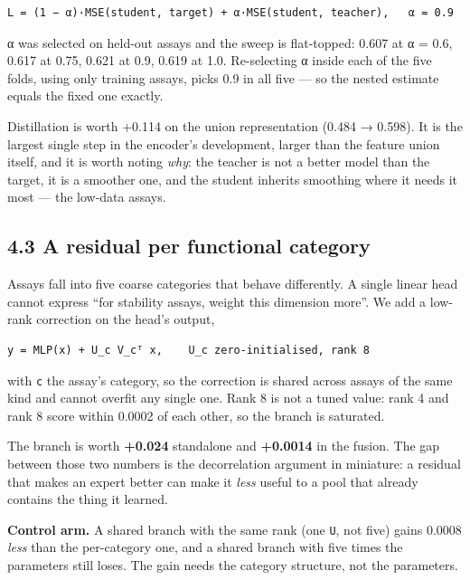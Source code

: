 \begin{verbatim}
L = (1 − α)·MSE(student, target) + α·MSE(student, teacher),   α = 0.9
\end{verbatim}

α was selected on held-out assays and the sweep is flat-topped: 0.607 at α = 0.6, 0.617 at 0.75, 0.621
at 0.9, 0.619 at 1.0. Re-selecting α inside each of the five folds, using only training assays, picks
0.9 in all five --- so the nested estimate equals the fixed one exactly.

Distillation is worth +0.114 on the union representation (0.484 → 0.598). It is the largest single step
in the encoder's development, larger than the feature union itself, and it is worth noting \emph{why}: the
teacher is not a better model than the target, it is a smoother one, and the student inherits smoothing
where it needs it most --- the low-data assays.

\hypertarget{a-residual-per-functional-category}{%
\subsection{4.3 A residual per functional category}\label{a-residual-per-functional-category}}

Assays fall into five coarse categories that behave differently. A single linear head cannot express
``for stability assays, weight this dimension more''. We add a low-rank correction on the head's output,

\begin{verbatim}
y = MLP(x) + U_c V_cᵀ x,    U_c zero-initialised, rank 8
\end{verbatim}

with \texttt{c} the assay's category, so the correction is shared across assays of the same kind and cannot
overfit any single one. Rank 8 is not a tuned value: rank 4 and rank 8 score within 0.0002 of each
other, so the branch is saturated.

The branch is worth \textbf{+0.024} standalone and \textbf{+0.0014} in the fusion. The gap between those two
numbers is the decorrelation argument in miniature: a residual that makes an expert better can make it
\emph{less} useful to a pool that already contains the thing it learned.

\textbf{Control arm.} A shared branch with the same rank (one \texttt{U}, not five) gains 0.0008 \emph{less} than the
per-category one, and a shared branch with five times the parameters still loses. The gain needs the
category structure, not the parameters.

